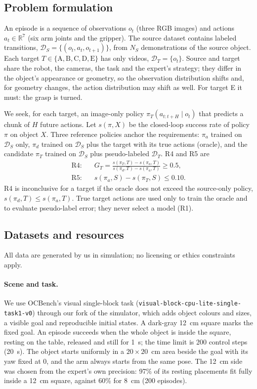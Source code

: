 \documentclass{article}
\begin{document}
\subsection{Problem formulation}
An episode is a sequence of observations $o_t$ (three RGB images) and actions
$a_t \in \mathbb{R}^7$ (six arm joints and the gripper). The source dataset contains
labeled transitions, $\mathcal{D}_S = \{(o_t, a_t, o_{t+1})\}$, from $N_S$ demonstrations
of the source object. Each target $T \in \{\mathrm{A, B, C, D, E}\}$ has only videos,
$\mathcal{D}_T = \{o_t\}$. Source and target share the robot, the cameras, the task and
the expert's strategy; they differ in the object's appearance or geometry, so the
observation distribution shifts and, for geometry changes, the action distribution may
shift as well. For target E it must: the grasp is turned.

We seek, for each target, an image-only policy $\pi_T(a_{t:t+H} \mid o_t)$ that predicts a
chunk of $H$ future actions. Let $s(\pi, X)$ be the closed-loop success rate of policy
$\pi$ on object $X$. Three reference policies anchor the requirements: $\pi_a$ trained
on $\mathcal{D}_S$ only, $\pi_d$ trained on $\mathcal{D}_S$ plus the target with its
true actions (oracle), and the candidate $\pi_T$ trained on $\mathcal{D}_S$ plus
pseudo-labeled $\mathcal{D}_T$. R4 and R5 are
\begin{align}
  \text{R4:}\quad & G_T = \frac{s(\pi_T, T) - s(\pi_a, T)}{s(\pi_d, T) - s(\pi_a, T)} \geq 0.5,
  \label{eq:r4} \\
  \text{R5:}\quad & s(\pi_a, S) - s(\pi_T, S) \leq 0.10 .
  \label{eq:r5}
\end{align}
R4 is inconclusive for a target if the oracle does not exceed the source-only policy,
$s(\pi_d, T) \leq s(\pi_a, T)$. True target actions are used only to train the oracle
and to evaluate pseudo-label error; they never select a model (R1).

\subsection{Datasets and resources}
\label{sec:data}
All data are generated by us in simulation; no licensing or ethics constraints apply.

\paragraph{Scene and task.}
We use OCBench's visual single-block task (\texttt{visual-block-cpu-lite-single-task1-v0})
through our fork of the simulator, which adds object colours and sizes, a visible goal
and reproducible initial states. A dark-gray 12~cm square marks the fixed goal. An episode
succeeds when the whole object is inside the square, resting on the table, released and
still for 1~s; the time limit is 200 control steps (20~s). The object starts uniformly in
a $20 \times 20$~cm area beside the goal with its yaw fixed at 0, and the arm always
starts from the same pose. The 12~cm side was chosen from the expert's own precision: 97\%
of its resting placements fit fully inside a 12~cm square, against 60\% for 8~cm (200
episodes).
\end{document}
